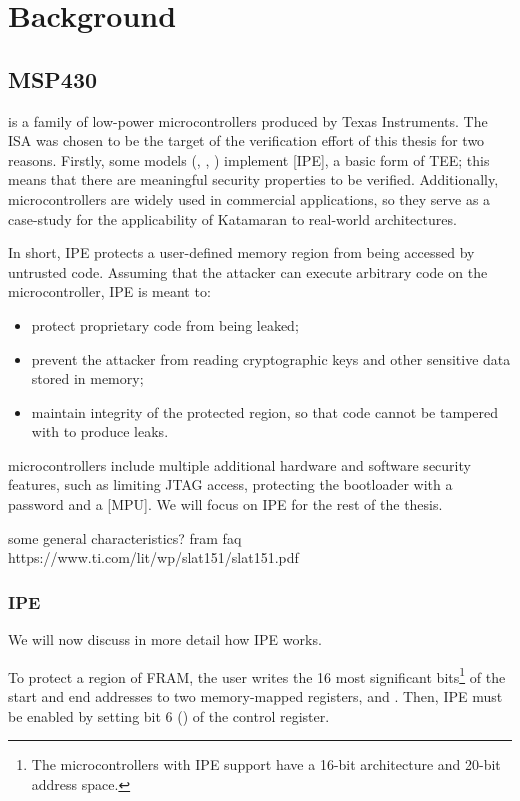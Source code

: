 \chapter{Background}

\section[\texorpdfstring{\msp}{MSP430}]{MSP430}

\msp is a family of low-power microcontrollers produced by Texas Instruments. The \msp ISA was chosen to be the target of the verification effort of this thesis for two reasons. Firstly, some models (\msp[FR58xx], \msp[FR59xx], \msp[FR6xx]) implement [IPE], a basic form of TEE; this means that there are meaningful security properties to be verified. Additionally, \msp microcontrollers are widely used in commercial applications, so they serve as a case-study for the applicability of Katamaran to real-world architectures.

In short, IPE protects a user-defined memory region from being accessed by untrusted code. Assuming that the attacker can execute arbitrary code on the microcontroller, IPE is meant to:
\begin{itemize}
\item protect proprietary code from being leaked;
\item prevent the attacker from reading cryptographic keys and other sensitive data stored in memory;
\item maintain integrity of the protected region, so that code cannot be tampered with to produce leaks.
\end{itemize}

\msp microcontrollers include multiple additional hardware and software security features, such as limiting JTAG access, protecting the bootloader with a password \cite{slaa685} and a [MPU]. We will focus on IPE for the rest of the thesis.

some general characteristics?
fram faq https://www.ti.com/lit/wp/slat151/slat151.pdf

\subsection{IPE}
\label{sec:ipe}

We will now discuss in more detail how IPE works.

To protect a region of FRAM, the user writes the 16 most significant bits\footnote{The \msp microcontrollers with IPE support have a 16-bit architecture and 20-bit address space.} of the start and end addresses to two memory-mapped registers,  and . Then, IPE must be enabled by setting bit 6 () of the  control register.

